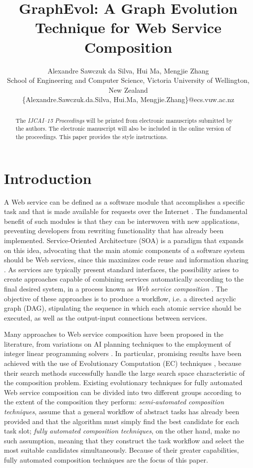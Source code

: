 \documentclass{article}
\title{GraphEvol: A Graph Evolution Technique for Web Service Composition}
\author{Alexandre Sawczuk da Silva, Hui Ma, Mengjie Zhang\\ School of
Engineering and Computer Science, Victoria University of Wellington, New Zealand\\
\{Alexandre.Sawczuk.da.Silva, Hui.Ma, Mengjie.Zhang\}@ecs.vuw.ac.nz}
\begin{document}
\maketitle

\begin{abstract}
  The {\it IJCAI--15 Proceedings} will be printed from electronic
  manuscripts submitted by the authors. The electronic manuscript will
  also be included in the online version of the proceedings. This paper
  provides the style instructions.
\end{abstract}

\section{Introduction}

A Web service can be defined as a software module that accomplishes a specific task and that is made available for requests over
the Internet \cite{gottschalk2002introduction}. The fundamental benefit of such modules is that they can be interwoven with new applications, preventing developers from rewriting
functionality that has already been implemented. Service-Oriented Architecture (SOA) is a paradigm that expands on this idea, advocating
that the main atomic components of a software system should be Web services, since this maximizes code reuse and information sharing \cite{perrey2003service}.
As services are typically present standard interfaces, the possibility arises to create approaches capable of combining services
automatically according to the final desired system, in a process known as \textit{Web service composition} \cite{milanovic2004current}. The objective of these approaches
is to produce a workflow, i.e. a directed acyclic graph (DAG), stipulating the sequence in which each atomic service should be executed, as well as
the output-input connections between services.

Many approaches to Web service composition have been proposed in the literature, from variations on AI planning techniques \cite{deng2013efficient} to the employment
of integer linear programming solvers \cite{yoo2008web}. In particular, promising results have been achieved with the use of Evolutionary Computation (EC) techniques \cite{wang2012survey},
because their search methods successfully handle the large search space characteristic of the composition problem. Existing evolutionary
techniques for fully automated Web service composition can be divided into two different groups according to the extent of the composition they
perform: \textit{semi-automated composition techniques}, assume that a general workflow of abstract tasks has already been provided and that the
algorithm must simply find the best candidate for each task slot; \textit{fully automated composition techniques}, on the other hand, make no such
assumption, meaning that they construct the task workflow and select the most suitable candidates simultaneously. Because of their greater capabilities,
fully automated composition techniques are the focus of this paper.
\end{document}
